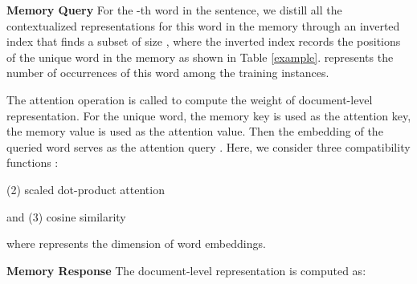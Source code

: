\documentclass[letterpaper]{article} \usepackage{aaai20}  \usepackage{times}  \usepackage{helvet} \usepackage{courier}  \usepackage[hyphens]{url}  \usepackage{graphicx} \urlstyle{rm} \def\UrlFont{\rm}  \usepackage{graphicx}  \frenchspacing  \setlength{\pdfpagewidth}{8.5in}  \setlength{\pdfpageheight}{11in}
\begin{document}
\noindent\textbf{Memory Query} 
For the -th word in the sentence, we distill all the contextualized representations for this word in the memory  through an inverted index that finds a subset  of size , where the inverted index records the positions of the unique word in the memory  as shown in Table \ref{example}.  represents the number of occurrences of this word among the training instances.

The attention operation is called to compute the weight of document-level representation. For the unique word, the memory key  is used as the attention key, the memory value  is used as the attention value. Then the embedding of the queried word serves as the attention query . Here, we consider three compatibility functions :

\begin{table}[t!] 
\centering
{}
\caption{Query operation for the word \emph{Italy}.  The numbers in parentheses indicate slot index of tokens in memory . The memory slots of these bold tokens in  training instances are retrieved according to the inverted index for \emph{Italy}. 
}\label{example}
\end{table}


(2) scaled dot-product attention \cite{vaswani2017attention}

and (3) cosine similarity 

where  represents the dimension of word embeddings.

\noindent\textbf{Memory Response}
The document-level representation is computed as:
\end{document}
